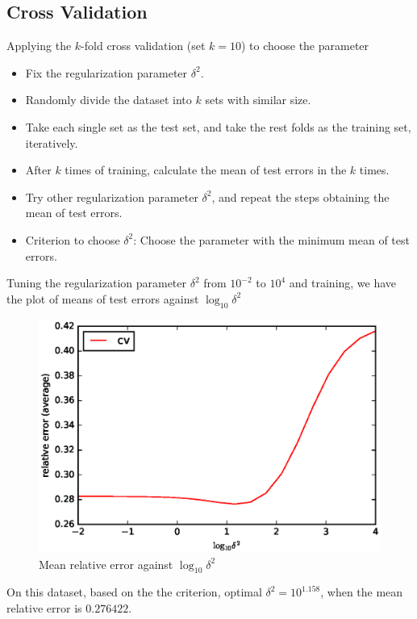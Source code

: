 \documentclass[10pt]{article}
\begin{document}
\subsection{Cross Validation}
Applying the $k$-fold cross validation \cite{kohavi1995study} (set $k = 10$) to choose the parameter
\begin{itemize}
\item Fix the regularization parameter $\delta^2$.
\item Randomly divide the dataset into $k$ sets with similar size.
\item Take each single set as the test set, and take the rest folds as the training set, iteratively.
\item After $k$ times of training, calculate the mean of test errors in the $k$ times.
\item Try other regularization parameter $\delta^2$, and repeat the steps obtaining the mean of test errors.
\item Criterion to choose $\delta^2$: Choose the parameter with the minimum mean of test errors.
\end{itemize}
Tuning the regularization parameter $\delta^2$ from $10^{-2}$ to $10^4$ and training, we have the plot of means of test errors against $\log_{10}\delta^2$
\begin{figure}[H]
\centering
\includegraphics[scale=.65]{plot2_3.eps}
\caption{Mean relative error against $\log_{10}\delta^2$}
\label{plot2_3}
\end{figure}
On this dataset, based on the the criterion, optimal $\delta^2 = 10^{1.158}$, when the mean relative error is $0.276422$.
\clearpage
\footnotesize


\end{document}
